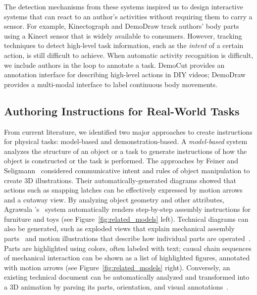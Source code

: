 The detection mechanisms from these systems inspired us to design interactive systems that can react to an author's activities without requiring them to carry  a sensor. For example, Kinectograph and DemoDraw track authors' body parts using a Kinect sensor that is widely available to consumers.
%
However, tracking techniques to detect high-level task information, such as the \emph{intent} of a certain action, is still difficult to achieve. When automatic activity recognition is difficult, we include authors in the loop to annotate a task. DemoCut provides an annotation interface for describing high-level actions in DIY videos; DemoDraw provides a multi-modal interface to label continuous body movements.



\subsection{Authoring Instructions for Real-World Tasks}

From current literature, we identified two major approaches to create instructions for physical tasks: model-based and demonstration-based.
%
A \emph{model-based} system analyzes the structure of an object or a task to generate instructions of how the object is constructed or the task is performed.
%
The approaches by Feiner and Seligmann~\cite{feiner:1985:AEA:1299975.1300548,Seligmann:1991:AGI:127719.122732} considered communicative intent and rules of object manipulation to create 3D illustrations. Their automatically-generated diagrams showed that actions such as snapping latches can be effectively expressed by motion arrows and a cutaway view.
%
By analyzing object geometry and other attributes, Agrawala \ea{}'s~\cite{agrawala2003designing} system automatically renders step-by-step assembly instructions for furniture and toys (see Figure~\ref{fig:related_models} left).
%
Technical diagrams can also be generated, such as exploded views that explain mechanical assembly parts~\cite{li2008automated} and motion illustrations that describe how individual parts are operated~\cite{mitra2010illustrating}. Parts are highlighted using colors, often labeled with text; causal chain sequences of mechanical interaction can be shown as a list of highlighted figures, annotated with motion arrows (see Figure~\ref{fig:related_models} right).
%
Conversely, an existing technical document can be automatically analyzed and transformed into a 3D animation by parsing its parts, orientation, and visual annotations~\cite{Mohr:2015:RTD:2702123.2702490}.

